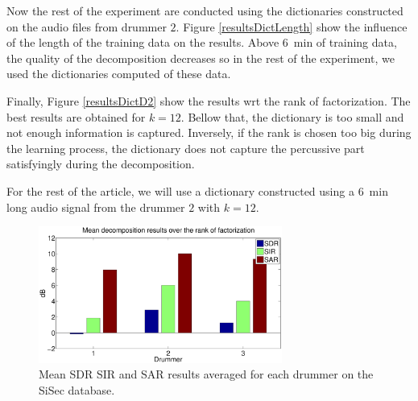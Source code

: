 Now the rest of the experiment are conducted using the dictionaries constructed on the audio files from drummer $2$. Figure \ref{resultsDictLength} show the influence of the length of the training data on the results. Above $6$~min of training data, the quality of the decomposition decreases so in the rest of the experiment, we used the dictionaries computed of these data.

Finally, Figure \ref{resultsDictD2} show the results wrt the rank of factorization. The best results are obtained for $k=12$. Bellow that, the dictionary is too small and not enough information is captured. Inversely, if the rank is chosen too big during the learning process, the dictionary does not capture the percussive part satisfyingly during the decomposition.

For the rest of the article, we will use a dictionary constructed using a $6$~min long audio signal from the drummer $2$ with $k=12$.

\begin{figure}[t]

  \centering 
  \includegraphics[width=8cm]{fig/ResultsMeanRank}
  \caption{\label{resultsDict} Mean SDR SIR and SAR results averaged for each drummer on the SiSec database.}
  
\end{figure}

